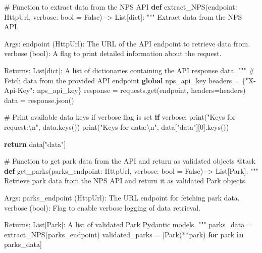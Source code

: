 \documentclass[
  letterpaper,
  DIV=11,
  numbers=noendperiod]{scrartcl}
\newenvironment{Shaded}{\begin{snugshade}}{\end{snugshade}}
\newcommand{\AttributeTok}[1]{\textcolor[rgb]{0.40,0.45,0.13}{#1}}
\newcommand{\BuiltInTok}[1]{\textcolor[rgb]{0.00,0.23,0.31}{#1}}
\newcommand{\CharTok}[1]{\textcolor[rgb]{0.13,0.47,0.30}{#1}}
\newcommand{\CommentTok}[1]{\textcolor[rgb]{0.37,0.37,0.37}{#1}}
\newcommand{\ControlFlowTok}[1]{\textcolor[rgb]{0.00,0.23,0.31}{\textbf{#1}}}
\newcommand{\DecValTok}[1]{\textcolor[rgb]{0.68,0.00,0.00}{#1}}
\newcommand{\KeywordTok}[1]{\textcolor[rgb]{0.00,0.23,0.31}{\textbf{#1}}}
\newcommand{\NormalTok}[1]{\textcolor[rgb]{0.00,0.23,0.31}{#1}}
\newcommand{\OperatorTok}[1]{\textcolor[rgb]{0.37,0.37,0.37}{#1}}
\newcommand{\StringTok}[1]{\textcolor[rgb]{0.13,0.47,0.30}{#1}}
\newcommand{\VariableTok}[1]{\textcolor[rgb]{0.07,0.07,0.07}{#1}}
\begin{document}
\begin{Shaded}
\begin{Highlighting}[]
\CommentTok{\# Function to extract data from the NPS API}
\KeywordTok{def}\NormalTok{ extract\_NPS(endpoint: HttpUrl, verbose: }\BuiltInTok{bool} \OperatorTok{=} \VariableTok{False}\NormalTok{) }\OperatorTok{{-}\textgreater{}}\NormalTok{ List[}\BuiltInTok{dict}\NormalTok{]:}
    \CommentTok{"""}
\CommentTok{    Extract data from the NPS API.}

\CommentTok{    Args:}
\CommentTok{        endpoint (HttpUrl): The URL of the API endpoint to retrieve data from.}
\CommentTok{        verbose (bool): A flag to print detailed information about the request.}

\CommentTok{    Returns:}
\CommentTok{        List[dict]: A list of dictionaries containing the API response data.}
\CommentTok{    """}
    \CommentTok{\# Fetch data from the provided API endpoint}
    \KeywordTok{global}\NormalTok{ nps\_api\_key}
\NormalTok{    headers }\OperatorTok{=}\NormalTok{ \{}\StringTok{"X{-}Api{-}Key"}\NormalTok{: nps\_api\_key\}}
\NormalTok{    response }\OperatorTok{=}\NormalTok{ requests.get(endpoint, headers}\OperatorTok{=}\NormalTok{headers)}
\NormalTok{    data }\OperatorTok{=}\NormalTok{ response.json()}

    \CommentTok{\# Print available data keys if verbose flag is set}
    \ControlFlowTok{if}\NormalTok{ verbose:}
        \BuiltInTok{print}\NormalTok{(}\StringTok{"Keys for request:}\CharTok{\textbackslash{}n}\StringTok{"}\NormalTok{, data.keys())}
        \BuiltInTok{print}\NormalTok{(}\StringTok{"Keys for \textquotesingle{}data\textquotesingle{}:}\CharTok{\textbackslash{}n}\StringTok{"}\NormalTok{, data[}\StringTok{"data"}\NormalTok{][}\DecValTok{0}\NormalTok{].keys())}

    \ControlFlowTok{return}\NormalTok{ data[}\StringTok{"data"}\NormalTok{]}

\CommentTok{\# Function to get park data from the API and return as validated objects}
\AttributeTok{@task}
\KeywordTok{def}\NormalTok{ get\_parks(parks\_endpoint: HttpUrl, verbose: }\BuiltInTok{bool} \OperatorTok{=} \VariableTok{False}\NormalTok{) }\OperatorTok{{-}\textgreater{}}\NormalTok{ List[Park]:}
    \CommentTok{"""}
\CommentTok{    Retrieve park data from the NPS API and return it as validated Park objects.}

\CommentTok{    Args:}
\CommentTok{        parks\_endpoint (HttpUrl): The URL endpoint for fetching park data.}
\CommentTok{        verbose (bool): Flag to enable verbose logging of data retrieval.}

\CommentTok{    Returns:}
\CommentTok{        List[Park]: A list of validated Park Pydantic models.}
\CommentTok{    """}
\NormalTok{    parks\_data }\OperatorTok{=}\NormalTok{ extract\_NPS(parks\_endpoint)}
\NormalTok{    validated\_parks }\OperatorTok{=}\NormalTok{ [Park(}\OperatorTok{**}\NormalTok{park) }\ControlFlowTok{for}\NormalTok{ park }\KeywordTok{in}\NormalTok{ parks\_data]}


\end{Highlighting}
\end{Shaded}
\end{document}

